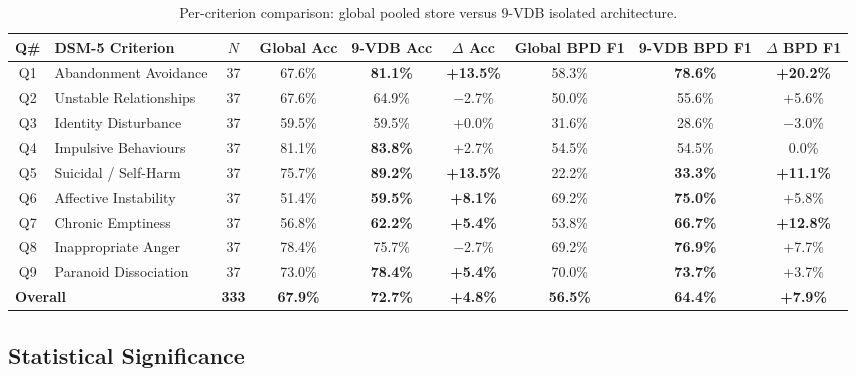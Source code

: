 \documentclass[11pt]{article}
\begin{document}
\begin{table}[H]
\centering
\caption{Per-criterion comparison: global pooled store versus 9-VDB isolated architecture.}
\label{tab:per_criterion}
\scriptsize
\setlength{\tabcolsep}{3pt}
\renewcommand{\arraystretch}{1.1}
\begin{tabular}{@{}clccccccc@{}}
\toprule
\textbf{Q\#} & \textbf{DSM-5 Criterion} & \textbf{$N$} &
\textbf{Global Acc} & \textbf{9-VDB Acc} & \textbf{$\Delta$ Acc} &
\textbf{Global BPD F1} & \textbf{9-VDB BPD F1} & \textbf{$\Delta$ BPD F1} \\
\midrule
Q1 & Abandonment Avoidance  & 37 & 67.6\% & \textbf{81.1\%} & \textbf{+13.5\%} &
     58.3\% & \textbf{78.6\%} & \textbf{+20.2\%} \\
Q2 & Unstable Relationships & 37 & 67.6\% &           64.9\% &          $-$2.7\% &
     50.0\% &           55.6\% &          +5.6\%  \\
Q3 & Identity Disturbance   & 37 & 59.5\% &           59.5\% &           +0.0\%  &
     31.6\% &           28.6\% &         $-$3.0\% \\
Q4 & Impulsive Behaviours   & 37 & 81.1\% & \textbf{83.8\%} &           +2.7\%  &
     54.5\% &           54.5\% &           0.0\%  \\
Q5 & Suicidal / Self-Harm   & 37 & 75.7\% & \textbf{89.2\%} & \textbf{+13.5\%} &
     22.2\% & \textbf{33.3\%} & \textbf{+11.1\%} \\
Q6 & Affective Instability  & 37 & 51.4\% & \textbf{59.5\%} &  \textbf{+8.1\%}  &
     69.2\% & \textbf{75.0\%} &           +5.8\% \\
Q7 & Chronic Emptiness      & 37 & 56.8\% & \textbf{62.2\%} &  \textbf{+5.4\%}  &
     53.8\% & \textbf{66.7\%} & \textbf{+12.8\%} \\
Q8 & Inappropriate Anger    & 37 & 78.4\% &           75.7\% &          $-$2.7\% &
     69.2\% & \textbf{76.9\%} &           +7.7\% \\
Q9 & Paranoid Dissociation  & 37 & 73.0\% & \textbf{78.4\%} &  \textbf{+5.4\%}  &
     70.0\% & \textbf{73.7\%} &           +3.7\% \\
\midrule
\multicolumn{2}{l}{\textbf{Overall}} & \textbf{333} &
\textbf{67.9\%} & \textbf{72.7\%} & \textbf{+4.8\%} &
\textbf{56.5\%} & \textbf{64.4\%} & \textbf{+7.9\%} \\
\bottomrule
\end{tabular}
\end{table}

\subsection{Statistical Significance}
\end{document}
